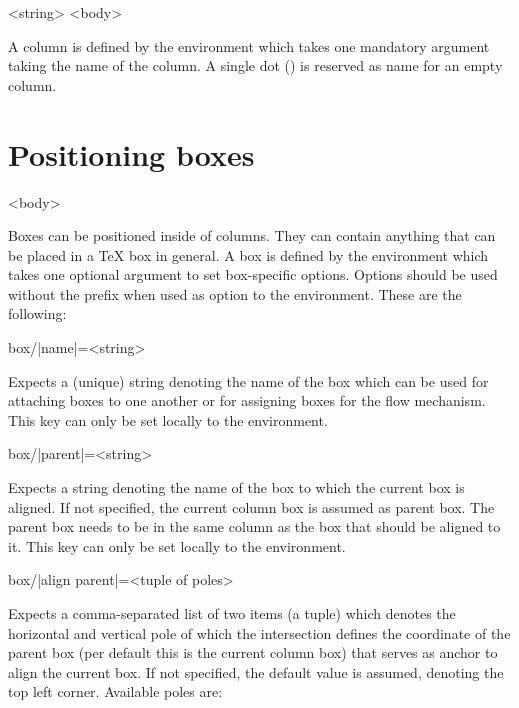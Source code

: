\documentclass[a4paper]{article}
\begin{document}
\begin{macrodef}
\null\begin{|leporellocolumn|}{<string>}
  <body>
\end{|leporellocolumn|}
\end{macrodef}
A column is defined by the  environment which takes one mandatory argument taking the name of the column. A single dot () is reserved as name for an empty column.

\section{Positioning boxes}

\begin{macrodef}
\null\begin{|leporellobox|}[<options>]
  <body>
\end{|leporellobox|}
\end{macrodef}
Boxes can be positioned inside of columns. They can contain anything that can be placed in a TeX box in general. A box is defined by the  environment which takes one optional argument to set box-specific options. Options should be used without the  prefix when used as option to the  environment. These are the following:

\begin{macrodef}
box/|name|={<string>}
\end{macrodef}
Expects a (unique) string denoting the name of the box which can be used for attaching boxes to one another or for assigning boxes for the flow mechanism. This key can only be set locally to the  environment.

\begin{macrodef}
box/|parent|={<string>}
\end{macrodef}
Expects a string denoting the name of the box to which the current box is aligned. If not specified, the current column box is assumed as parent box. The parent box needs to be in the same column as the box that should be aligned to it. This key can only be set locally to the  environment.

\begin{macrodef}
box/|align parent|={<tuple of poles>}
\end{macrodef}
Expects a comma-separated list of two items (a tuple) which denotes the horizontal and vertical pole of which the intersection defines the coordinate of the parent box (per default this is the current column box) that serves as anchor to align the current box. If not specified, the default value  is assumed, denoting the top left corner. Available poles are:
\end{document}
